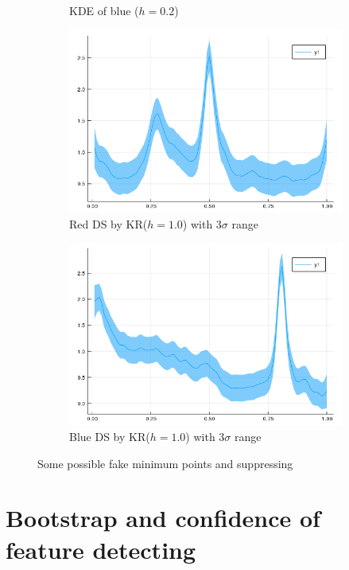 \documentclass{article}
\begin{document}
\begin{figure}[htb]
\begin{subfigure}[b]{0.24\linewidth}
    \caption{KDE of blue ($h=0.2$)}
  \end{subfigure}
  \begin{subfigure}[b]{0.24\linewidth}
    \includegraphics[width=\linewidth]{images/kde_reg_r.png}
    \caption{Red DS by KR($h=1.0$) with 3$\sigma$ range}
  \end{subfigure}
  \begin{subfigure}[b]{0.24\linewidth}
    \includegraphics[width=\linewidth]{images/kde_reg_b.png}
    \caption{Blue DS by KR($h=1.0$) with 3$\sigma$ range}
  \end{subfigure}
  \caption{Some possible fake minimum points and suppressing}
  \label{fig:DS_REG}
\end{figure}


\section{Bootstrap and confidence of feature detecting}
\end{document}
